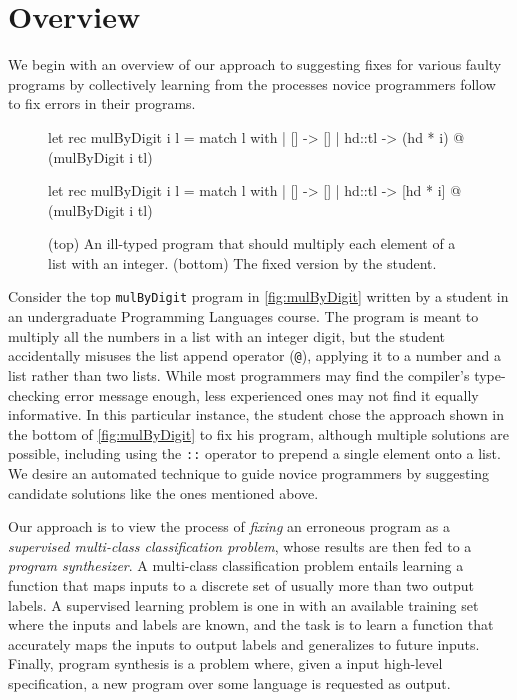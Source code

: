 \section{Overview}
\label{sec:overview}

We begin with an overview of our approach to suggesting fixes for various faulty
programs by collectively learning from the processes novice programmers follow
to fix errors in their programs.

\begin{figure}[ht]
\begin{ecode}
let rec mulByDigit i l =
  match l with
  | []     -> []
  | hd::tl -> (hd * i) @ (mulByDigit i tl)
\end{ecode}

\begin{ecode}
let rec mulByDigit i l =
  match l with
  | []     -> []
  | hd::tl -> [hd * i] @ (mulByDigit i tl)
\end{ecode}
\caption{(top) An ill-typed \ocaml program that should multiply each element
of a list with an integer. (bottom) The fixed version by the student.}
\label{fig:mulByDigit}
\end{figure}


 Consider the top \texttt{mulByDigit} program in
\autoref{fig:mulByDigit} written by a student in an undergraduate Programming
Languages course. The program is meant to multiply all the numbers in a list
with an integer digit, but the student accidentally misuses the list append
operator (\texttt{@}), applying it to a number and a list rather than two lists.
While most programmers may find the compiler's type-checking error message
enough, less experienced ones may not find it equally informative. In this
particular instance, the student chose the approach shown in the bottom of
\autoref{fig:mulByDigit} to fix his program, although multiple solutions are
possible, including using the \texttt{::} operator to prepend a single element
onto a list. We desire an automated technique to guide novice programmers by
suggesting candidate solutions like the ones mentioned above.

 Our approach is to view the process of \emph{fixing} an erroneous
program as a \emph{supervised multi-class classification problem}, whose results
are then fed to a \emph{program synthesizer}. A multi-class classification
problem entails learning a function that maps inputs to a discrete set of
usually more than two output labels. A supervised learning problem is one in
with an available training set where the inputs and labels are known, and the
task is to learn a function that accurately maps the inputs to output labels and
generalizes to future inputs. Finally, program synthesis is a problem where,
given a input high-level specification, a new program over some language is
requested as output.

